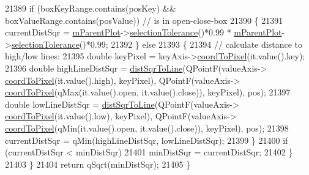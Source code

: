 \begin{DoxyCode}
21389       \textcolor{keywordflow}{if} (boxKeyRange.contains(posKey) && boxValueRange.contains(posValue)) \textcolor{comment}{// is in open-close-box}
21390       \{
21391         currentDistSqr = \hyperlink{class_q_c_p_layerable_aa2a528433e44db02b8aef23c1f9f90ed}{mParentPlot}->\hyperlink{class_q_custom_plot_a7b738074c75e80070ef6a10263c6cd69}{selectionTolerance}()*0.99 * 
      \hyperlink{class_q_c_p_layerable_aa2a528433e44db02b8aef23c1f9f90ed}{mParentPlot}->\hyperlink{class_q_custom_plot_a7b738074c75e80070ef6a10263c6cd69}{selectionTolerance}()*0.99;
21392       \} \textcolor{keywordflow}{else}
21393       \{
21394         \textcolor{comment}{// calculate distance to high/low lines:}
21395         \textcolor{keywordtype}{double} keyPixel = keyAxis->\hyperlink{class_q_c_p_axis_a985ae693b842fb0422b4390fe36d299a}{coordToPixel}(it.value().key);
21396         \textcolor{keywordtype}{double} highLineDistSqr = \hyperlink{class_q_c_p_abstract_plottable_a5ea1cab44ca912dcdc96ed81ec5bed5d}{distSqrToLine}(QPointF(valueAxis->
      \hyperlink{class_q_c_p_axis_a985ae693b842fb0422b4390fe36d299a}{coordToPixel}(it.value().high), keyPixel), QPointF(valueAxis->
      \hyperlink{class_q_c_p_axis_a985ae693b842fb0422b4390fe36d299a}{coordToPixel}(qMax(it.value().open, it.value().close)), keyPixel), pos);
21397         \textcolor{keywordtype}{double} lowLineDistSqr = \hyperlink{class_q_c_p_abstract_plottable_a5ea1cab44ca912dcdc96ed81ec5bed5d}{distSqrToLine}(QPointF(valueAxis->
      \hyperlink{class_q_c_p_axis_a985ae693b842fb0422b4390fe36d299a}{coordToPixel}(it.value().low), keyPixel), QPointF(valueAxis->
      \hyperlink{class_q_c_p_axis_a985ae693b842fb0422b4390fe36d299a}{coordToPixel}(qMin(it.value().open, it.value().close)), keyPixel), pos);
21398         currentDistSqr = qMin(highLineDistSqr, lowLineDistSqr);
21399       \}
21400       \textcolor{keywordflow}{if} (currentDistSqr < minDistSqr)
21401         minDistSqr = currentDistSqr;
21402     \}
21403   \}
21404   \textcolor{keywordflow}{return} qSqrt(minDistSqr);
21405 \}
\end{DoxyCode}


